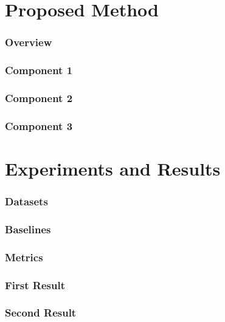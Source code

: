 \documentclass[aspectratio=169]{beamer}
\begin{document}
\section{Proposed Method}

\begin{frame}
\frametitle{Overview}

\end{frame}


\begin{frame}
\frametitle{Component 1}

\end{frame}

\begin{frame}
\frametitle{Component 2}

\end{frame}

\begin{frame}
\frametitle{Component 3}

\end{frame}

\section{Experiments and Results}
\begin{frame}
\frametitle{Datasets}

\end{frame}

\begin{frame}
\frametitle{Baselines}


\end{frame}

\begin{frame}
\frametitle{Metrics}

\end{frame}

\begin{frame}
\frametitle{First Result}

\end{frame}

\begin{frame}
\frametitle{Second Result}

\end{frame}

\end{document}
